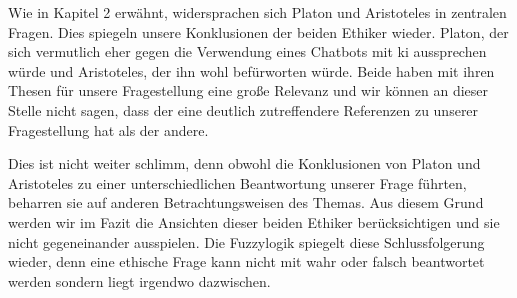 Wie in Kapitel 2 erwähnt, widersprachen sich Platon und Aristoteles in zentralen Fragen. Dies spiegeln unsere Konklusionen der beiden Ethiker wieder. Platon, der sich vermutlich eher gegen die Verwendung eines Chatbots mit \ac{ki} aussprechen würde und Aristoteles, der ihn wohl befürworten würde. Beide haben mit ihren Thesen für unsere Fragestellung eine große Relevanz und wir können an dieser Stelle nicht sagen, dass der eine deutlich zutreffendere Referenzen zu unserer Fragestellung hat als der andere. 

Dies ist nicht weiter schlimm, denn obwohl die Konklusionen von Platon und Aristoteles zu einer unterschiedlichen Beantwortung unserer Frage führten, beharren sie auf anderen Betrachtungsweisen des Themas. Aus diesem Grund werden wir im Fazit die Ansichten dieser beiden Ethiker berücksichtigen und sie nicht gegeneinander ausspielen. Die Fuzzylogik spiegelt diese Schlussfolgerung wieder, denn eine ethische Frage kann nicht mit wahr oder falsch beantwortet werden sondern liegt irgendwo dazwischen. 



